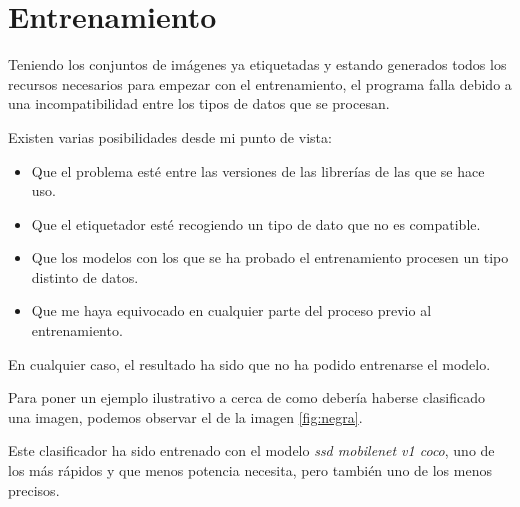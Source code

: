 
\section{Entrenamiento}
Teniendo los conjuntos de imágenes ya etiquetadas y estando generados todos los recursos necesarios para empezar con el entrenamiento, el programa falla debido a una incompatibilidad entre los tipos de datos que se procesan.

Existen varias posibilidades desde mi punto de vista:

\begin{itemize}
	\item Que el problema esté entre las versiones de las librerías de las que se hace uso. 
	
	\item Que el etiquetador esté recogiendo un tipo de dato que no es compatible.
	
	\item Que los modelos con los que se ha probado el entrenamiento procesen un tipo distinto de datos.
	
	\item Que me haya equivocado en cualquier parte del proceso previo al entrenamiento.
	
\end{itemize}

En cualquier caso, el resultado ha sido que no ha podido entrenarse el modelo.

Para poner un ejemplo ilustrativo a cerca de como debería haberse clasificado una imagen, podemos observar el de la imagen \ref{fig:negra}.

Este clasificador ha sido entrenado con el modelo \textit{ssd mobilenet v1 coco}, uno de los más rápidos y que menos potencia necesita, pero también uno de los menos precisos.
